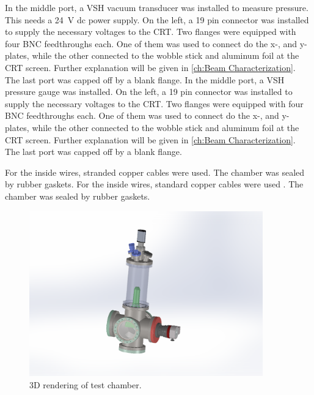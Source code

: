 In the middle port, a VSH vacuum transducer was installed to measure pressure. This needs a \SI{24}{\volt} dc power supply. On the left, a 19 pin connector  was installed to supply the necessary voltages to the CRT. Two flanges were equipped with four BNC feedthroughs each. One of them was used to connect do the x-, and y-plates, while the other connected to the wobble stick and aluminum foil at the CRT screen. Further explanation will be given in \cref{ch:Beam Characterization}. The last port was capped off by a blank flange.
In the middle port, a VSH   pressure gauge was installed. On the left, a 19 pin connector   was installed to supply the necessary voltages to the CRT. Two flanges were equipped with four BNC feedthroughs each. One of them was used to connect do the x-, and y-plates, while the other connected to the wobble stick and aluminum foil at the CRT screen. Further explanation will be given in \cref{ch:Beam Characterization}. The last port was capped off by a blank flange.
 
For the inside wires, stranded copper cables were used. The chamber was sealed by rubber gaskets.
For the inside wires, standard copper cables were used . The chamber was sealed by rubber  gaskets.
 
\begin{figure}[ht]
	\centering
 	
	\includegraphics[width=0.9\textwidth]{./Chapters/vacuum-chamber/test_chamber} %
	
	\caption{3D rendering of test chamber.}
	\label{fig:3D rendering of test chamber}
\end{figure}
 
